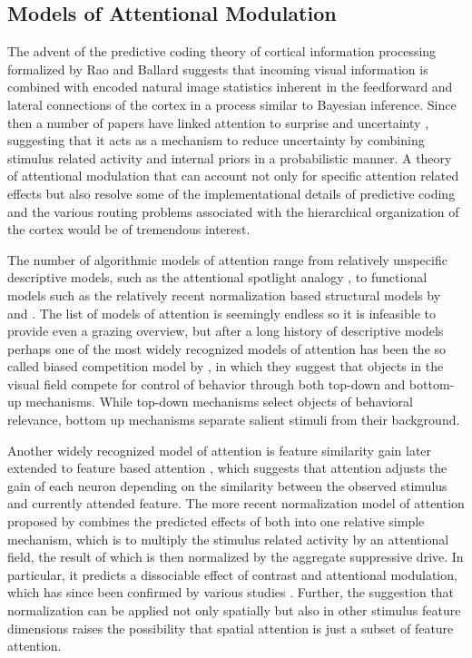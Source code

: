 \subsection{Models of Attentional Modulation}

The advent of the predictive coding theory of cortical information
processing formalized by Rao and Ballard \citep{Rao1999} suggests that
incoming visual information is combined with encoded natural image
statistics inherent in the feedforward and lateral connections of the
cortex in a process similar to Bayesian inference. Since then a number
of papers have linked attention to surprise and uncertainty
\citep{Feldman2010,Itti2009,Rao2005,Yu2005}, suggesting that it acts
as a mechanism to reduce uncertainty by combining stimulus related
activity and internal priors in a probabilistic manner. A theory of
attentional modulation that can account not only for specific
attention related effects but also resolve some of the
implementational details of predictive coding and the various routing
problems associated with the hierarchical organization of the cortex
would be of tremendous interest.

The number of algorithmic models of attention range from relatively
unspecific descriptive models, such as the attentional spotlight
analogy \citep{Posner1980}, to functional models such as the
relatively recent normalization based structural models by
\cite{Reynolds2009} and \cite{Lee2009}. The list of models of
attention is seemingly endless so it is infeasible to provide even a
grazing overview, but after a long history of descriptive models
perhaps one of the most widely recognized models of attention has been
the so called biased competition model by \cite{Desimone1995}, in
which they suggest that objects in the visual field compete for
control of behavior through both top-down and bottom-up
mechanisms. While top-down mechanisms select objects of behavioral
relevance, bottom up mechanisms separate salient stimuli from their
background.

Another widely recognized model of attention is feature similarity
gain \citep{Treue2001} later extended to feature based attention
\citep{Maunsell2006}, which suggests that attention adjusts the gain
of each neuron depending on the similarity between the observed
stimulus and currently attended feature. The more recent normalization
model of attention proposed by \cite{Reynolds2009} combines the
predicted effects of both into one relative simple mechanism, which is
to multiply the stimulus related activity by an attentional field, the
result of which is then normalized by the aggregate suppressive
drive. In particular, it predicts a dissociable effect of contrast and
attentional modulation, which has since been confirmed by various
studies \citep{Lee2009, Pooresmaeili2010}. Further, the suggestion
that normalization can be applied not only spatially but also in other
stimulus feature dimensions raises the possibility that spatial
attention is just a subset of feature attention.

